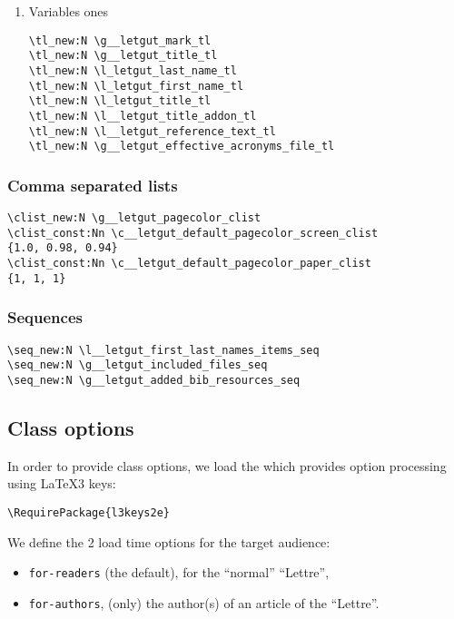 \documentclass{letgut}
\begin{document}
\begin{enumerate}
\item Variables ones
\label{ImplementationDeclarationsTokenlistsVariablesones-pxcg55h0jlj0}
\begin{lstlisting}
\tl_new:N \g__letgut_mark_tl
\tl_new:N \g__letgut_title_tl
\tl_new:N \l_letgut_last_name_tl
\tl_new:N \l_letgut_first_name_tl
\tl_new:N \l_letgut_title_tl
\tl_new:N \l__letgut_title_addon_tl
\tl_new:N \l__letgut_reference_text_tl
\tl_new:N \g__letgut_effective_acronyms_file_tl
\end{lstlisting}
\end{enumerate}

\subsubsection{Comma separated lists}
\label{ImplementationDeclarationsCommaseparatedlists-vhdg55h0jlj0}
\begin{lstlisting}
\clist_new:N \g__letgut_pagecolor_clist
\clist_const:Nn \c__letgut_default_pagecolor_screen_clist
{1.0, 0.98, 0.94}
\clist_const:Nn \c__letgut_default_pagecolor_paper_clist
{1, 1, 1}
\end{lstlisting}

\subsubsection{Sequences}
\label{ImplementationDeclarationsSequences-m2eg55h0jlj0}
\begin{lstlisting}
\seq_new:N \l__letgut_first_last_names_items_seq
\seq_new:N \g__letgut_included_files_seq
\seq_new:N \g__letgut_added_bib_resources_seq
\end{lstlisting}

\subsection{Class options}
\label{ImplementationClassoptions-4meg55h0jlj0}
In order to provide class options, we load the  which provides
\LaTeXe{} option processing using \LaTeX3 keys:

\begin{lstlisting}
\RequirePackage{l3keys2e}
\end{lstlisting}

We define the 2 load time options for the target audience:

\begin{itemize}
\item \lstinline+for-readers+ (the default), for the “normal” “Lettre”,
\item \lstinline+for-authors+, (only) the author(s) of an article of the “Lettre”.
\end{itemize}
\end{document}
